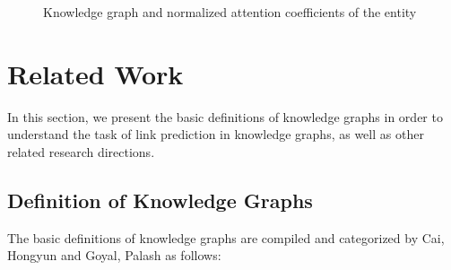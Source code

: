 
\begin{figure*}[htp]
	\centering
	\resizebox{\textwidth}{!}{%
		
	}
	\caption{Knowledge graph and normalized attention coefficients of the entity}
	\label{fig:graphExample}
\end{figure*}


\section{Related Work}
\label{chap:RelatedWork}

In this section, we present the basic definitions of knowledge graphs in order to understand the task of link prediction in knowledge graphs, as well as other related research directions.

\subsection{Definition of Knowledge Graphs}

The basic definitions of knowledge graphs are compiled and categorized by Cai, Hongyun \cite{cai2018comprehensive} and Goyal, Palash \cite{goyal2018graph} as follows:




